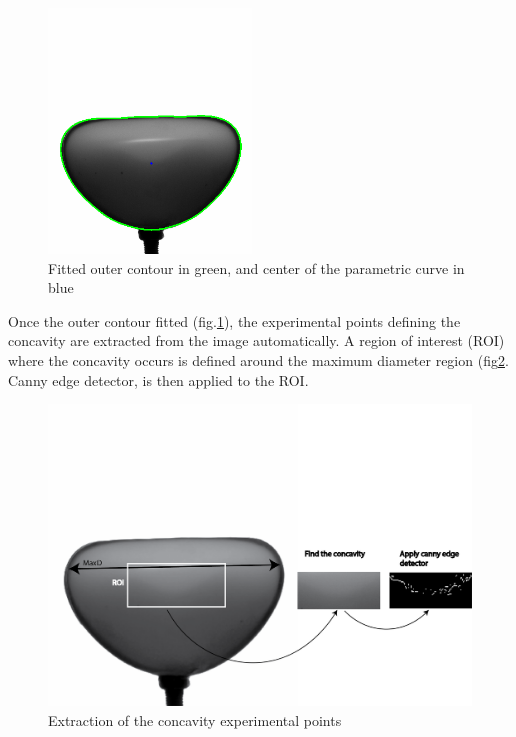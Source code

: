 \paragraph{}
\begin{figure}[H] %
	\centering%
  \includegraphics[width=0.48\textwidth]{figures/Chapter_1/outer_contour.png}
	\caption{Fitted outer contour in green, and center of the parametric curve in blue}
	\label{fig:outer_contour}
\end{figure}
Once the outer contour fitted (fig.\ref{fig:outer_contour}), the experimental points defining the concavity are extracted from the image automatically. A region of interest (ROI) where the concavity occurs is defined around the maximum diameter region (fig\ref{fig:concavity_extraction}. Canny edge detector, is then applied to the ROI.
\begin{figure}[H] %
	\centering%
  \includegraphics[width=\textwidth]{figures/Chapter_1/concavity_extraction.png}
	\caption{Extraction of the concavity experimental points}
	\label{fig:concavity_extraction}
\end{figure}
